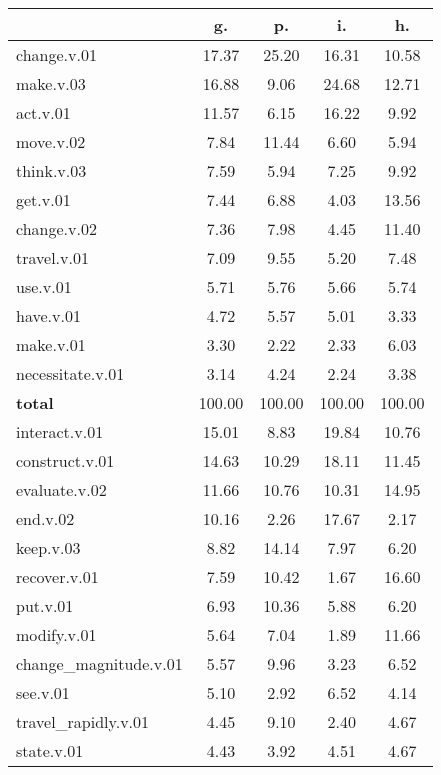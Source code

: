 \begin{table}[h!]
\begin{center}
\begin{tabular}{| l || c | c | c | c |}\hline
 & {\bf g.} & {\bf p.} & {\bf i.} & {\bf h.} \\\hline\hline
change.v.01 & 17.37  & 25.20  & 16.31  & 10.58 \\\hline
make.v.03 & 16.88  & 9.06  & 24.68  & 12.71 \\\hline
act.v.01 & 11.57  & 6.15  & 16.22  & 9.92 \\\hline
move.v.02 & 7.84  & 11.44  & 6.60  & 5.94 \\\hline
think.v.03 & 7.59  & 5.94  & 7.25  & 9.92 \\\hline
get.v.01 & 7.44  & 6.88  & 4.03  & 13.56 \\\hline
change.v.02 & 7.36  & 7.98  & 4.45  & 11.40 \\\hline
travel.v.01 & 7.09  & 9.55  & 5.20  & 7.48 \\\hline
use.v.01 & 5.71  & 5.76  & 5.66  & 5.74 \\\hline
have.v.01 & 4.72  & 5.57  & 5.01  & 3.33 \\\hline
make.v.01 & 3.30  & 2.22  & 2.33  & 6.03 \\\hline
necessitate.v.01 & 3.14  & 4.24  & 2.24  & 3.38 \\\hline\hline
{{\bf total}} & 100.00  & 100.00  & 100.00  & 100.00 \\\hline\hline\hline
interact.v.01 & 15.01  & 8.83  & 19.84  & 10.76 \\\hline
construct.v.01 & 14.63  & 10.29  & 18.11  & 11.45 \\\hline
evaluate.v.02 & 11.66  & 10.76  & 10.31  & 14.95 \\\hline
end.v.02 & 10.16  & 2.26  & 17.67  & 2.17 \\\hline
keep.v.03 & 8.82  & 14.14  & 7.97  & 6.20 \\\hline
recover.v.01 & 7.59  & 10.42  & 1.67  & 16.60 \\\hline
put.v.01 & 6.93  & 10.36  & 5.88  & 6.20 \\\hline
modify.v.01 & 5.64  & 7.04  & 1.89  & 11.66 \\\hline
change\_magnitude.v.01 & 5.57  & 9.96  & 3.23  & 6.52 \\\hline
see.v.01 & 5.10  & 2.92  & 6.52  & 4.14 \\\hline
travel\_rapidly.v.01 & 4.45  & 9.10  & 2.40  & 4.67 \\\hline
state.v.01 & 4.43  & 3.92  & 4.51  & 4.67 \\\hline\hline

\end{tabular}
\end{center}
\end{table}
